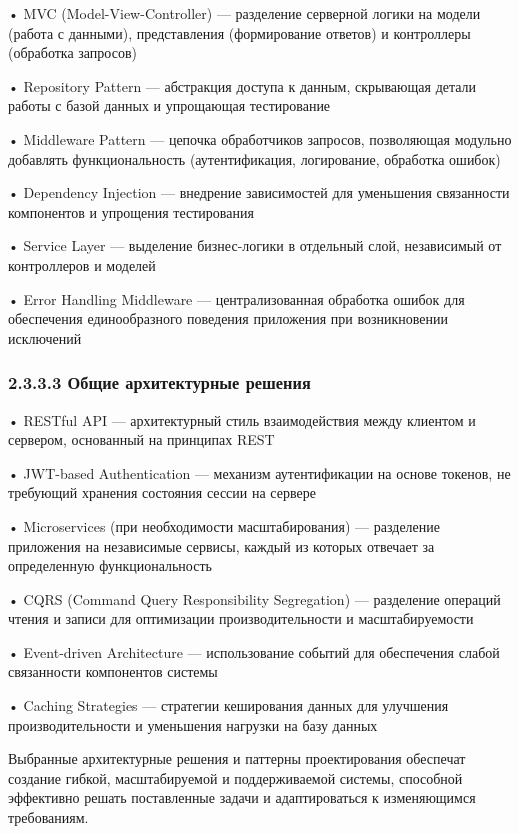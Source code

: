 {  \par \redline • MVC (Model-View-Controller) — разделение серверной логики на модели (работа с данными), представления (формирование ответов) и контроллеры (обработка запросов)
  \par \redline • Repository Pattern — абстракция доступа к данным, скрывающая детали работы с базой данных и упрощающая тестирование
  \par \redline • Middleware Pattern — цепочка обработчиков запросов, позволяющая модульно добавлять функциональность (аутентификация, логирование, обработка ошибок)
  \par \redline • Dependency Injection — внедрение зависимостей для уменьшения связанности компонентов и упрощения тестирования
  \par \redline • Service Layer — выделение бизнес-логики в отдельный слой, независимый от контроллеров и моделей
  \par \redline • Error Handling Middleware — централизованная обработка ошибок для обеспечения единообразного поведения приложения при возникновении исключений

  \subsubsection*{2.3.3.3 Общие архитектурные решения}

  \par \redline • RESTful API — архитектурный стиль взаимодействия между клиентом и сервером, основанный на принципах REST
  \par \redline • JWT-based Authentication — механизм аутентификации на основе токенов, не требующий хранения состояния сессии на сервере
  \par \redline • Microservices (при необходимости масштабирования) — разделение приложения на независимые сервисы, каждый из которых отвечает за определенную функциональность
  \par \redline • CQRS (Command Query Responsibility Segregation) — разделение операций чтения и записи для оптимизации производительности и масштабируемости
  \par \redline • Event-driven Architecture — использование событий для обеспечения слабой связанности компонентов системы
  \par \redline • Caching Strategies — стратегии кеширования данных для улучшения производительности и уменьшения нагрузки на базу данных

  \par \redline Выбранные архитектурные решения и паттерны проектирования обеспечат создание гибкой, масштабируемой и поддерживаемой системы, способной эффективно решать поставленные задачи и адаптироваться к изменяющимся требованиям.

  \par
}

